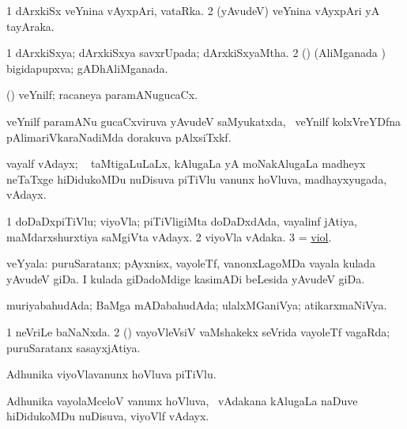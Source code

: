\bentry
{} 
\gl{\nA}
\expl{}
\bmng
\bnum
\num{1} dArxkiSx veYnina vAyxpAri, vataRka. 
\num{2} (yAvudeV) veYnina vAyxpAri yA tayAraka. 
\enum
\emng
\eentry

\bentry
{} 
\gl{\gu}
\expl{}
\bmng
\bnum
\num{1} dArxkiSxya; dArxkiSxya savxrUpada; dArxkiSxyaMtha. 
\num{2} (\rUpa) (AliMganada \vi) bigidapupxva; gADhAliMganada. 
\enum
\emng
\eentry

\bentry
{} 
\gl{\gu}
\expl{}
\bmng
(\ravi) veYnilf;  racaneya paramANugucaCx. 
\emng
\eentry

\bentry
{} 
\gl{\nA}
\expl{}
\bmng
veYnilf paramANu gucaCxviruva yAvudeV saMyukatxda, \kanmu\ veYnilf kolxVreYDfna pAlimariVkaraNadiMda dorakuva pAlxsiTxkf. 
\emng
\eentry

\bentry
{} 
\gl{\nA}
\expl{}
\bmng
 vayalf vAdayx; \sA\  taMtigaLuLaLx, kAlugaLa yA moNakAlugaLa madheyx neTaTxge hiDidukoMDu nuDisuva piTiVlu \mo vanunx hoVluva, madhayxyugada, vAdayx.  
\emng
\eentry

\bentry
{} 
\gl{\nA}
\expl{}
\bmng
\bnum
\num{1} doDaDxpiTiVlu; viyoVla; piTiVligiMta doDaDxdAda, vayalinf jAtiya, maMdarxshurxtiya saMgiVta vAdayx. 
\num{2} viyoVla vAdaka. 
\num{3} = \hyperlink{viol}{viol}. 
\enum
\emng
\eentry

\bentry
{} 
\gl{\nA}
\expl{}
\bmng
 veYyala: 
\banum
{} puruSaratanx; pAyxnisx, vayoleTf, \mo vanonxLagoMDa vayala kulada yAvudeV giDa. 
 I kulada giDadoMdige kasimADi beLesida yAvudeV giDa. 
\eanum
\emng
\eentry

\bentry
{} 
\gl{\gu}
\expl{}
\bmng
 muriyabahudAda; BaMga mADabahudAda; ulalxMGaniVya; atikarxmaNiVya. 
\emng
\eentry

\bentry
{} 
\gl{\gu}
\expl{}
\bmng
\bnum
\num{1} neVriLe baNaNxda. 
\num{2} (\savi) vayoVleVsiV vaMshakekx seVrida vayoleTf vagaRda; puruSaratanx sasayxjAtiya. 
\enum
\emng
\eentry

\bentry
{} 
\gl{\nA}
\expl{}
\bmng
 Adhunika viyoVlavanunx hoVluva piTiVlu. 
\emng
\eentry

\bentry
{} 
\gl{\nA}
\expl{}
\bmng
 Adhunika vayolaMceloV  vanunx hoVluva, \kanmu\ vAdakana kAlugaLa naDuve hiDidukoMDu nuDisuva, viyoVlf vAdayx. 
\emng
\eentry

